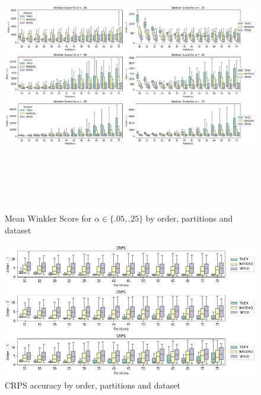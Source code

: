 \begin{figure}[htb]
    \centering
    \includegraphics[width=\textwidth,height=12cm]{figures/pwfts_gridsearch_interval.png}
    \caption{Mean Winkler Score for $\alpha \in \{.05,.25\}$ by order, partitions and dataset}
    \label{fig:pwfts_gridsearch_interval}
\end{figure}

\begin{figure}[htb]
    \centering
    \includegraphics[width=\textwidth]{figures/pwfts_gridsearch_probabilistic.png}
    \caption{CRPS accuracy by order, partitions and dataset}
    \label{fig:pwfts_gridsearch_probabilistic}
\end{figure}


